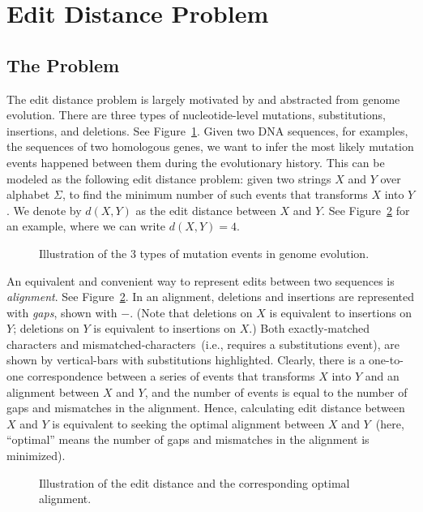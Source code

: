 \documentclass[letterpaper,11pt]{article}
\theoremstyle{mytheorem}
\begin{document}
\section*{Edit Distance Problem}

\subsection*{The Problem}

The edit distance problem is largely motivated by and abstracted from genome evolution.
There are three types of nucleotide-level mutations, substitutions, insertions, and deletions.
See Figure~\ref{fig:edits}. Given two DNA sequences, for examples, the sequences of two homologous genes,
we want to infer the most likely mutation events happened between them during the evolutionary history.
This can be modeled as the following edit distance problem: given two strings $X$ and $Y$ over alphabet $\Sigma$,
to find the minimum number of such events that transforms $X$ into $Y$.
We denote by $d(X, Y)$ as the edit distance between $X$ and $Y$.
See Figure~\ref{fig:align} for an example, where we can write $d(X, Y) = 4$.

\begin{figure}[h]
\centering{}
\caption{Illustration of the 3 types of mutation events in genome evolution.}
\label{fig:edits}
\end{figure}

An equivalent and convenient way to represent edits between two sequences 
is \emph{alignment}. See Figure~\ref{fig:align}.
In an alignment, deletions and insertions are represented with \emph{gaps}, shown with $-$.
(Note that deletions on $X$ is equivalent to insertions on $Y$;
deletions on $Y$ is equivalent to insertions on $X$.)
Both exactly-matched characters and mismatched-characters~(i.e., requires a substitutions event),
are shown by vertical-bars with substitutions highlighted.
Clearly, there is a one-to-one correspondence between a series
of events that transforms $X$ into $Y$ and an alignment between $X$ and $Y$,
and the number of events is equal to the number of gaps and mismatches in the alignment.
Hence, calculating edit distance between $X$ and $Y$ is equivalent to
seeking the optimal alignment between $X$ and $Y$~(here, ``optimal'' means
the number of gaps and mismatches in the alignment is minimized).

\begin{figure}[h]
\centering{}
\caption{Illustration of the edit distance and the corresponding optimal alignment.}
\label{fig:align}
\end{figure}
\end{document}
